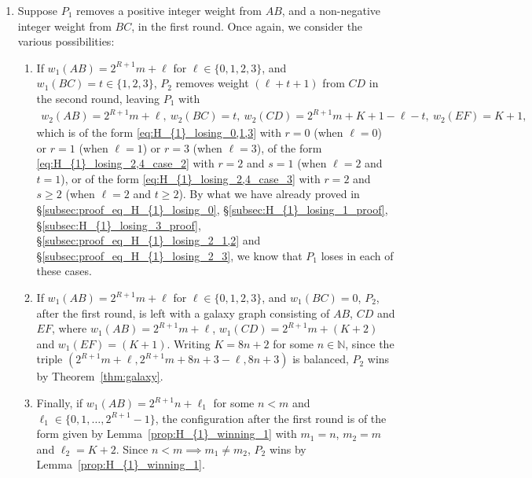 \documentclass[11pt,reqno]{amsart}
\theoremstyle{definition}
\theoremstyle{definition}
\begin{document}
\begin{enumerate}
\begin{enumerate}
\item Finally, if $w_{1}(CD)=2^{R+1}n+\ell_{1}$ for some $n<m$ and $\ell_{1}\in\{0,1,\ldots,2^{R+1}-1\}$, the configuration after the first round is of the form given by Lemma~\ref{prop:H_{1}_winning_1} with $m_{1}=n$, $m_{2}=m$ and $\ell_{2}=4$. Since $n<m \implies m_{1}\neq m_{2}$, $P_{2}$ wins by Lemma~\ref{prop:H_{1}_winning_1}.
\end{enumerate}

\item Suppose $P_{1}$ removes a positive integer weight from $AB$, and a non-negative integer weight from $BC$, in the first round. Once again, we consider the various possibilities:
\begin{enumerate}
\item If $w_{1}(AB)=2^{R+1}m+\ell$ for $\ell \in \{0,1,2,3\}$, and $w_{1}(BC)=t\in\{1,2,3\}$, $P_{2}$ removes weight $(\ell+t+1)$ from $CD$ in the second round, leaving $P_{1}$ with
\begin{align}
w_{2}(AB)=2^{R+1}m+\ell,\ w_{2}(BC)=t,\ w_{2}(CD)=2^{R+1}m+K+1-\ell-t,\ w_{2}(EF)=K+1,\nonumber
\end{align}
which is of the form \eqref{eq:H_{1}_losing_0,1,3} with $r=0$ (when $\ell=0$) or $r=1$ (when $\ell=1$) or $r=3$ (when $\ell=3$), of the form \eqref{eq:H_{1}_losing_2,4_case_2} with $r=2$ and $s=1$ (when $\ell=2$ and $t=1$), or of the form \eqref{eq:H_{1}_losing_2,4_case_3} with $r=2$ and $s\geqslant 2$ (when $\ell=2$ and $t \geqslant 2$). By what we have already proved in \S\ref{subsec:proof_eq_H_{1}_losing_0}, \S\ref{subsec:H_{1}_losing_1_proof}, \S\ref{subsec:H_{1}_losing_3_proof}, \S\ref{subsec:proof_eq_H_{1}_losing_2_1,2} and \S\ref{subsec:proof_eq_H_{1}_losing_2_3}, we know that $P_{1}$ loses in each of these cases. 

\item If $w_{1}(AB)=2^{R+1}m+\ell$ for $\ell \in \{0,1,2,3\}$, and $w_{1}(BC)=0$, $P_{2}$, after the first round, is left with a galaxy graph consisting of $AB$, $CD$ and $EF$, where $w_{1}(AB)=2^{R+1}m+\ell$, $w_{1}(CD)=2^{R+1}m+(K+2)$ and $w_{1}(EF)=(K+1)$. Writing $K=8n+2$ for some $n \in \mathbb{N}$, since the triple $\left(2^{R+1}m+\ell,2^{R+1}m+8n+3-\ell,8n+3\right)$ is balanced, $P_{2}$ wins by Theorem~\ref{thm:galaxy}.

\item Finally, if $w_{1}(AB)=2^{R+1}n+\ell_{1}$ for some $n<m$ and $\ell_{1}\in\{0,1,\ldots,2^{R+1}-1\}$, the configuration after the first round is of the form given by Lemma~\ref{prop:H_{1}_winning_1} with $m_{1}=n$, $m_{2}=m$ and $\ell_{2}=K+2$. Since $n<m \implies m_{1}\neq m_{2}$, $P_{2}$ wins by Lemma~\ref{prop:H_{1}_winning_1}.
\end{enumerate}


\end{enumerate}
\end{document}
